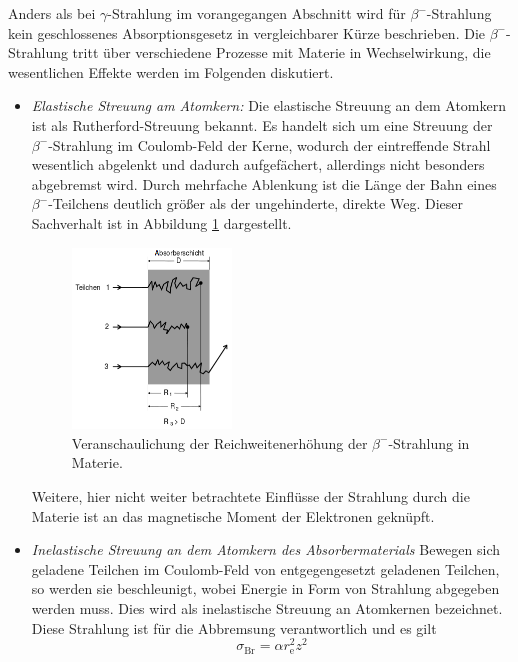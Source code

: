 Anders als bei $\gamma$-Strahlung im vorangegangen Abschnitt wird für  $\beta^-$-Strahlung kein geschlossenes Absorptionsgesetz in vergleichbarer Kürze beschrieben.
Die $\beta^-$-Strahlung tritt über verschiedene Prozesse mit Materie in Wechselwirkung, die wesentlichen Effekte werden im Folgenden diskutiert.

\begin{itemize}
	\item{\emph{Elastische Streuung am Atomkern:}
Die elastische Streuung an dem Atomkern ist als Rutherford-Streuung bekannt.
Es handelt sich um eine Streuung der $\beta^-$-Strahlung im Coulomb-Feld der Kerne, wodurch der eintreffende Strahl wesentlich abgelenkt und dadurch aufgefächert, allerdings nicht besonders abgebremst wird.
Durch mehrfache Ablenkung ist die Länge der Bahn eines $\beta^-$-Teilchens deutlich größer als der ungehinderte, direkte Weg.
Dieser Sachverhalt ist in Abbildung \ref{fig:bahnen} dargestellt.\\
\begin{figure}[hb]
	\centering
	\includegraphics[width=0.4\textwidth]{Bilder/reichweite.png}
	\caption{Veranschaulichung der Reichweitenerhöhung der $\beta^-$-Strahlung in Materie. \cite{skript}}
	\label{fig:bahnen}
\end{figure}
Weitere, hier nicht weiter betrachtete Einflüsse der Strahlung durch die Materie ist an das magnetische Moment der Elektronen geknüpft.
}
	\item{\emph{Inelastische Streuung an dem Atomkern des Absorbermaterials}
Bewegen sich geladene Teilchen im Coulomb-Feld von entgegengesetzt geladenen Teilchen, so werden sie beschleunigt, 
wobei Energie in Form von Strahlung abgegeben werden muss.
Dies wird als inelastische Streuung an Atomkernen bezeichnet.
Diese Strahlung ist für die Abbremsung verantwortlich und es gilt
\begin{equation}
 	\sigma_\text{Br}=\alpha r_\text{e}^2 z^2
 \end{equation} 
}
\end{itemize}
